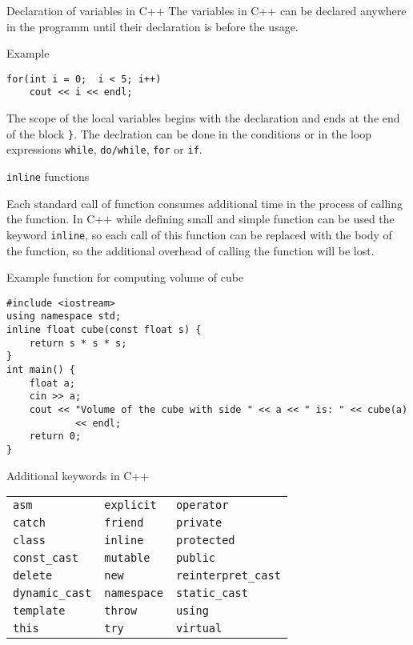 \begin{frame}[fragile]{Declaration of variables in C++}
The variables in C++ can be declared anywhere in the programm until their
declaration is before the usage.
\begin{exampleblock}{Example}
\begin{lstlisting}
for(int i = 0;  i < 5; i++) 
    cout << i << endl;
\end{lstlisting}
\end{exampleblock}
The scope of the local variables begins with the declaration and ends at the end
of the block \texttt{\}}. The declration can be done in the
conditions or in the loop expressions \texttt{while}, \texttt{do/while},
\texttt{for} or \texttt{if}.
\end{frame}

\begin{frame}[fragile]{\texttt{inline} functions}
\begin{scriptsize}
Each standard call of function consumes additional time in the process of
calling the function. In C++ while defining small and simple function can be
used the keyword \texttt{inline}, so each call of this function can be
replaced with the body of the function, so the additional overhead of calling
the function will be lost.
\end{scriptsize}
\begin{exampleblock}{Example function for computing volume of cube}
\begin{lstlisting}
#include <iostream>
using namespace std;
inline float cube(const float s) {
    return s * s * s;
}
int main() {
    float a;
    cin >> a;
    cout << "Volume of the cube with side " << a << " is: " << cube(a)
            << endl;
    return 0;
}
\end{lstlisting}
\end{exampleblock}
\end{frame}

\begin{frame}{Additional keywords in C++}
\begin{center}
    \begin{tabular}{l l l}
        \texttt{asm} & \texttt{explicit} & \texttt{operator}  \\
        \texttt{catch} & \texttt{friend} & \texttt{private} \\
        \texttt{class} & \texttt{inline} & \texttt{protected} \\ 
        \texttt{const\_cast} & \texttt{mutable} & \texttt{public} \\ 
        \texttt{delete} & \texttt{new} & \texttt{reinterpret\_cast} \\
        \texttt{dynamic\_cast} & \texttt{namespace} & \texttt{static\_cast} \\ 
        \texttt{template} & \texttt{throw} & \texttt{using} \\
        \texttt{this} & \texttt{try} & \texttt{virtual}
    \end{tabular}
\end{center}    
\end{frame}

